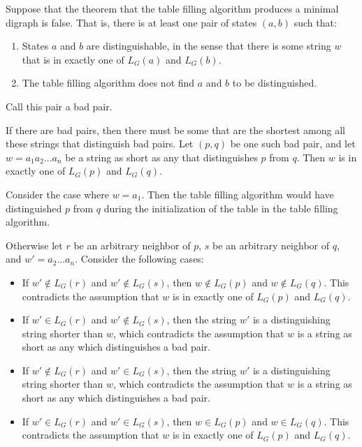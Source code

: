 
Suppose that the theorem that the table filling algorithm
produces a minimal digraph is false. That is, there is at
least one pair of states $(a, b)$ such that:

\begin{enumerate}
    \item States $a$ and $b$ are distinguishable, in the sense
    that there is some string $w$ that is in exactly one of
    $L_G(a)$ and $L_G(b)$.
    \item The table filling algorithm does not find $a$ and
    $b$ to be distinguished.
\end{enumerate}

Call this pair a bad pair.

If there are bad pairs, then there
must be some that are the shortest among all these strings that
distinguish bad pairs. Let $(p,q)$ be one such bad pair, and let
$w=a_1 a_2 ... a_n$ be a string as short as any that distinguishes
$p$ from $q$. Then $w$ is in exactly one of $L_G(p)$ and $L_G(q)$.

Consider the case where $w=a_1$. Then the table filling algorithm
would have distinguished $p$ from $q$ during the initialization of
the table in the table filling algorithm.

Otherwise let $r$ be an arbitrary neighbor of $p$, $s$ be an arbitrary
neighbor of $q$, and $w'=a_2 ... a_n$. Consider the following cases:

\begin{itemize}
    \item If $w' \notin L_G(r)$ and $w' \notin L_G(s)$, then $w \notin L_G(p)$
    and $w \notin L_G(q)$. This contradicts the assumption that $w$
    is in exactly one of $L_G(p)$ and $L_G(q)$.
    \item If $w' \in L_G(r)$ and $w' \notin L_G(s)$, then the string $w'$ is
    a distinguishing string shorter than $w$, which contradicts the
    assumption that $w$ is a string as short as any which
    distinguishes a bad pair.
    \item If $w' \notin L_G(r)$ and $w' \in L_G(s)$, then the string $w'$ is
    a distinguishing string shorter than $w$, which contradicts the
    assumption that $w$ is a string as short as any which
    distinguishes a bad pair.
    \item If $w' \in L_G(r)$ and $w' \in L_G(s)$, then $w \in L_G(p)$ and
    $w \in L_G(q)$. This contradicts the assumption that $w$ is in
    exactly one of $L_G(p)$ and $L_G(q)$.
\end{itemize}


